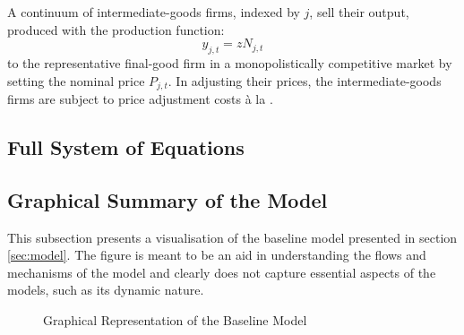 \documentclass[12pt]{article} %
\numberwithin{equation}{section} %
\begin{document}
\begin{refsection}
\begin{appendices}
A continuum of intermediate-goods firms, indexed by $j$, sell their output, produced with the production function:
\begin{equation}
    y_{j,t} = z N_{j,t}
\end{equation}
to the representative final-good firm in a monopolistically competitive market by setting the nominal price $P_{j,t}$. In adjusting their prices, the intermediate-goods firms are subject to price adjustment costs à la \textcite{rotemberg1982}.

\subsection{Full System of Equations}
\label{sec-app:full-equations}

\subsection{Graphical Summary of the Model}
\label{sec-app:full-graphical}

This subsection presents a visualisation of the baseline model presented in section \ref{sec:model}. The figure is meant to be an aid in understanding the flows and mechanisms of the model and clearly does not capture essential aspects of the models, such as its dynamic nature.

\begin{figure}[H]
\centering
\caption{Graphical Representation of the Baseline Model}
\label{fig:graphical-model}
\end{figure}
\end{appendices}
\end{refsection}
\end{document}
